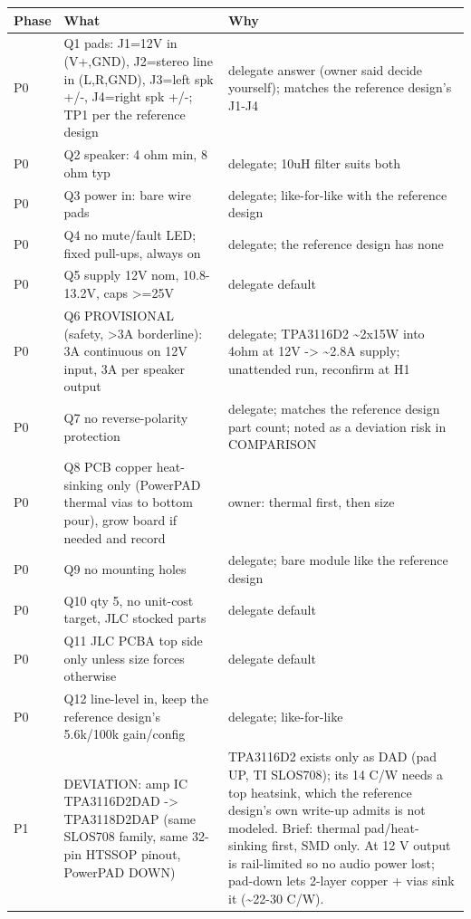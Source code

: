 \documentclass[11pt,a4paper]{article}
\begin{document}
{\small
\begin{longtable}{lp{5.2cm}p{7.2cm}}
\toprule
\textbf{Phase} & \textbf{What} & \textbf{Why} \\
\midrule
\endhead
P0 & Q1 pads: J1=12V in (V+,GND), J2=stereo line in (L,R,GND), J3=left spk +/-, J4=right spk +/-; TP1 per the reference design & delegate answer (owner said decide yourself); matches the reference design's J1-J4 \\
P0 & Q2 speaker: 4 ohm min, 8 ohm typ & delegate; 10uH filter suits both \\
P0 & Q3 power in: bare wire pads & delegate; like-for-like with the reference design \\
P0 & Q4 no mute/fault LED; fixed pull-ups, always on & delegate; the reference design has none \\
P0 & Q5 supply 12V nom, 10.8-13.2V, caps \textgreater{}=25V & delegate default \\
P0 & Q6 PROVISIONAL (safety, \textgreater{}3A borderline): 3A continuous on 12V input, 3A per speaker output & delegate; TPA3116D2 \textasciitilde{}2x15W into 4ohm at 12V -\textgreater{} \textasciitilde{}2.8A supply; unattended run, reconfirm at H1 \\
P0 & Q7 no reverse-polarity protection & delegate; matches the reference design part count; noted as a deviation risk in COMPARISON \\
P0 & Q8 PCB copper heat-sinking only (PowerPAD thermal vias to bottom pour), grow board if needed and record & owner: thermal first, then size \\
P0 & Q9 no mounting holes & delegate; bare module like the reference design \\
P0 & Q10 qty 5, no unit-cost target, JLC stocked parts & delegate default \\
P0 & Q11 JLC PCBA top side only unless size forces otherwise & delegate default \\
P0 & Q12 line-level in, keep the reference design's 5.6k/100k gain/config & delegate; like-for-like \\
P1 & DEVIATION: amp IC TPA3116D2DAD -\textgreater{} TPA3118D2DAP (same SLOS708 family, same 32-pin HTSSOP pinout, PowerPAD DOWN) & TPA3116D2 exists only as DAD (pad UP, TI SLOS708); its 14 C/W needs a top heatsink, which the reference design's own write-up admits is not modeled. Brief: thermal pad/heat-sinking first, SMD only. At 12 V output is rail-limited so no audio power lost; pad-down lets 2-layer copper + vias sink it (\textasciitilde{}22-30 C/W). \\

\end{longtable}}
\end{document}
